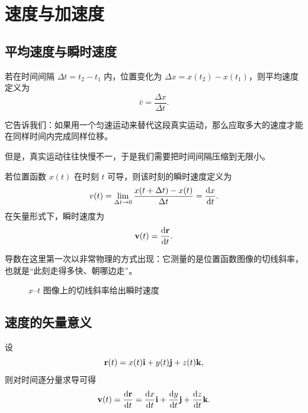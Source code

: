 \section{速度与加速度}

\subsection{平均速度与瞬时速度}

若在时间间隔 $\Delta t=t_2-t_1$ 内，位置变化为 $\Delta x=x(t_2)-x(t_1)$，则平均速度定义为
\[
\bar v=\frac{\Delta x}{\Delta t}.
\]

它告诉我们：如果用一个匀速运动来替代这段真实运动，那么应取多大的速度才能在同样时间内完成同样位移。

但是，真实运动往往快慢不一，于是我们需要把时间间隔压缩到无限小。

\begin{definition}[瞬时速度]
若位置函数 $x(t)$ 在时刻 $t$ 可导，则该时刻的瞬时速度定义为
\[
 v(t)=\lim_{\Delta t\to 0}\frac{x(t+\Delta t)-x(t)}{\Delta t}=\dv{x}{t}.
\]
在矢量形式下，瞬时速度为
\[
\vb{v}(t)=\dv{\vb{r}}{t}.
\]
\end{definition}

导数在这里第一次以非常物理的方式出现：它测量的是位置函数图像的切线斜率，也就是``此刻走得多快、朝哪边走''。

\begin{figure}[H]
\centering
{}
\caption{$x$--$t$ 图像上的切线斜率给出瞬时速度}
\end{figure}

\subsection{速度的矢量意义}

设
\[
\vb{r}(t)=x(t)\vb{i}+y(t)\vb{j}+z(t)\vb{k},
\]
则对时间逐分量求导可得
\[
\vb{v}(t)=\dv{\vb{r}}{t}=\dv{x}{t}\vb{i}+\dv{y}{t}\vb{j}+\dv{z}{t}\vb{k}.
\]

